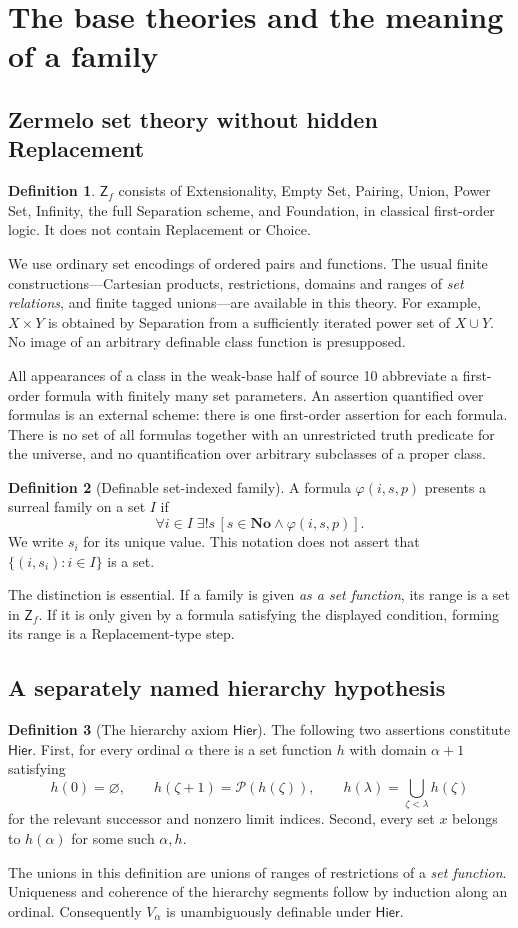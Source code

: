 \documentclass[11pt,letterpaper]{article}
\theoremstyle{definition}
\newtheorem{definition}[definition]{Definition}\aliascntresetthe{definition}
\theoremstyle{remark}
\newcommand{\No}{\mathbf{No}}
\newcommand{\Pow}{\mathcal P}
\newcommand{\Zf}{\mathsf{Z}_{\!f}}
\newcommand{\Hier}{\mathsf{Hier}}
\begin{document}
\section{The base theories and the meaning of a family}
\label{hset:zr:sec:base}

\subsection{Zermelo set theory without hidden Replacement}
\begin{definition}
$\Zf$ consists of Extensionality, Empty Set, Pairing, Union, Power Set, Infinity, the full Separation scheme, and Foundation, in classical first-order logic. It does not contain Replacement or Choice.
\end{definition}
We use ordinary set encodings of ordered pairs and functions. The usual finite constructions---Cartesian products, restrictions, domains and ranges of \emph{set relations}, and finite tagged unions---are available in this theory. For example, $X\times Y$ is obtained by Separation from a sufficiently iterated power set of $X\cup Y$. No image of an arbitrary definable class function is presupposed.

All appearances of a class in the weak-base half of source 10 abbreviate a first-order formula with finitely many set parameters. An assertion quantified over formulas is an external scheme: there is one first-order assertion for each formula. There is no set of all formulas together with an unrestricted truth predicate for the universe, and no quantification over arbitrary subclasses of a proper class.

\begin{definition}[Definable set-indexed family]
A formula $\varphi(i,s,p)$ presents a surreal family on a set $I$ if
\[
\forall i\in I\;\exists!s\,[s\in\No\land\varphi(i,s,p)].
\]
We write $s_i$ for its unique value. This notation does not assert that $\{(i,s_i):i\in I\}$ is a set.
\end{definition}
The distinction is essential. If a family is given \emph{as a set function}, its range is a set in $\Zf$. If it is only given by a formula satisfying the displayed condition, forming its range is a Replacement-type step.

\subsection{A separately named hierarchy hypothesis}
\begin{definition}[The hierarchy axiom $\Hier$]
The following two assertions constitute $\Hier$.
First, for every ordinal $\alpha$ there is a set function $h$ with domain $\alpha+1$ satisfying
\[
h(0)=\varnothing,\qquad h(\zeta+1)=\Pow(h(\zeta)),\qquad
h(\lambda)=\bigcup_{\zeta<\lambda}h(\zeta)
\]
for the relevant successor and nonzero limit indices. Second, every set $x$ belongs to $h(\alpha)$ for some such $\alpha,h$.
\end{definition}
The unions in this definition are unions of ranges of restrictions of a \emph{set function}. Uniqueness and coherence of the hierarchy segments follow by induction along an ordinal. Consequently $V_\alpha$ is unambiguously definable under $\Hier$.
\end{document}
